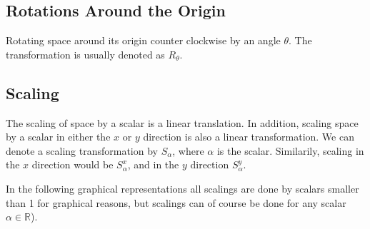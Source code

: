 \subsection{Rotations Around the Origin}
Rotating space around its origin counter clockwise by an angle $\theta$. The transformation is usually denoted as $R_{\theta}$.
\begin{figure}[H]
  \centering
\end{figure}

\subsection{Scaling}
The scaling of space by a scalar is a linear translation. In addition, scaling space by a scalar in either the $x$ or $y$ direction is also a linear transformation. We can denote a scaling transformation by $S_{\alpha}$, where $\alpha$ is the scalar. Similarily, scaling in the $x$ direction would be $S^{x}_{\alpha}$, and in the $y$ direction $S^{y}_{\alpha}$.

\begin{warning}
In the following graphical representations all scalings are done by scalars smaller than 1 for graphical reasons, but scalings can of course be done for any scalar $\alpha\in\mathbb{R}$).
\end{warning}

